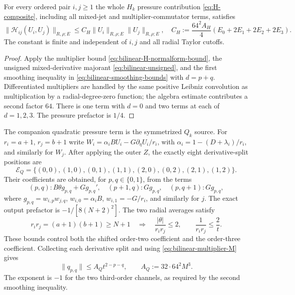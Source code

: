 \begin{theorem}\label{thm:full-H}
For every ordered pair $i,j\ge1$ the whole $H_k$ pressure contribution \eqref{eq:H-composite}, including all mixed-jet and multiplier-commutator terms, satisfies
\begin{equation}\label{eq:full-H-bound}
 \|\mathcal H_{ij}(U_i,U_j)\|_{R,\rho;E}
 \le C_H\|U_i\|_{R,\rho;E}\|U_j\|_{R,\rho;E},
 \quad C_H:=\frac{64^2A_H}{4}(E_0+2E_1+2E_2+2E_3).
\end{equation}
The constant is finite and independent of $i,j$ and all radial Taylor cutoffs.
\end{theorem}
\begin{proof}
Apply the multiplier bound \eqref{eq:bilinear-H-normalform-bound}, the unsigned mixed-derivative majorant \eqref{eq:bilinear-unsigned}, and the first smoothing inequality in \eqref{eq:bilinear-smoothing-bounds} with $d=p+q$. Differentiated multipliers are handled by the same positive Leibniz convolution as multiplication by a radial-degree-zero function; the algebra estimate contributes a second factor $64$. There is one term with $d=0$ and two terms at each of $d=1,2,3$. The pressure prefactor is $1/4$.
\end{proof}

The companion quadratic pressure term is the symmetrized $Q_k$ source. For $r_i=a+1$, $r_j=b+1$ write $W_i=\alpha_i B U_i-G\partial_\eta U_i/r_i$, with $\alpha_i=1-(D+\lambda_i)/r_i$, and similarly for $W_j$. After applying the outer $Z$, the exactly eight derivative-split positions are
\[
\mathcal E_Q=\{(0,0),(1,0),(0,1),(1,1),
 (2,0),(0,2),(2,1),(1,2)\}.
\]
Their coefficients are obtained, for $p,q\in\{0,1\}$, from the terms
\begin{equation}\label{eq:Q-source-normalform}
 (p,q):B\theta g_{p,q}+Gg_{p,q}',\quad
 (p+1,q):Gg_{p,q},\quad (p,q+1):Gg_{p,q},
\end{equation}
where $g_{p,q}=w_{i,p}w_{j,q}$, $w_{i,0}=\alpha_iB$, $w_{i,1}=-G/r_i$, and similarly for $j$. The exact output prefactor is $-1/[8(N+2)^2]$.
The two radial averages satisfy
\begin{equation}\label{eq:quadratic-double-average}
 r_ir_j=(a+1)(b+1)\ge N+1
 \quad\Longrightarrow\quad
 \frac{|\theta|}{r_ir_j}\le2,\qquad
 \frac1{r_ir_j}\le\frac2t.
\end{equation}
These bounds control both the shifted order-two coefficient and the order-three coefficient. Collecting each derivative split and using \eqref{eq:bilinear-multiplier-M} gives
\begin{equation}\label{eq:bilinear-Q-normalform-bound}
 \|q_{p,q}\|\le A_Q t^{2-p-q},
 \qquad A_Q:=32\cdot64^2M^3.
\end{equation}
The exponent is $-1$ for the two third-order channels, as required by the second smoothing inequality.

